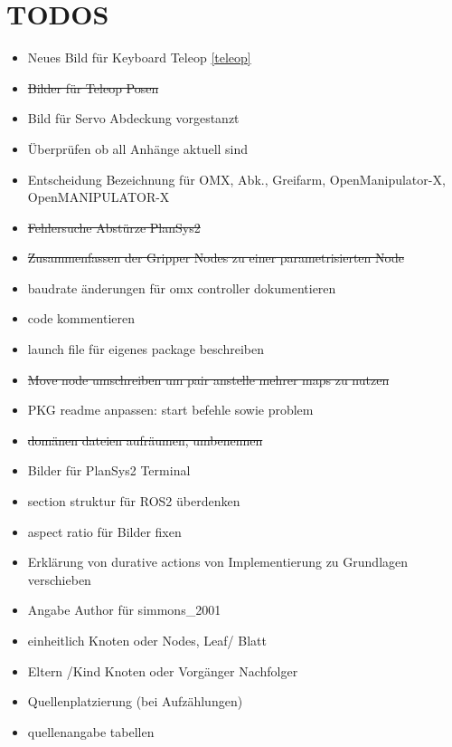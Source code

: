 \section{TODOS}
\begin{itemize}
\item Neues Bild für Keyboard Teleop \ref{teleop}
\item \sout{Bilder für Teleop Posen}
\item Bild für Servo Abdeckung vorgestanzt
\item Überprüfen ob all Anhänge aktuell sind
\item Entscheidung Bezeichnung für OMX, Abk., Greifarm, OpenManipulator-X, OpenMANIPULATOR-X
\item \sout{Fehlersuche Abstürze PlanSys2}
\item \sout{Zusammenfassen der Gripper Nodes zu einer parametrisierten Node}
\item baudrate änderungen für omx controller dokumentieren
\item code kommentieren
\item launch file für eigenes package beschreiben
\item \sout{Move node umschreiben um pair anstelle mehrer maps zu nutzen}
\item PKG readme anpassen: start befehle sowie problem
\item \sout{domänen dateien aufräumen, umbenennen}
\item Bilder für PlanSys2 Terminal
\item section struktur für ROS2 überdenken
\item aspect ratio für Bilder fixen
    \item Erklärung von durative actions von Implementierung zu Grundlagen verschieben
    \item Angabe Author für simmons\_2001
    \item einheitlich Knoten oder Nodes, Leaf/ Blatt
    \item Eltern /Kind Knoten oder Vorgänger Nachfolger
    \item Quellenplatzierung (bei Aufzählungen)
    \item quellenangabe tabellen
\end{itemize}
